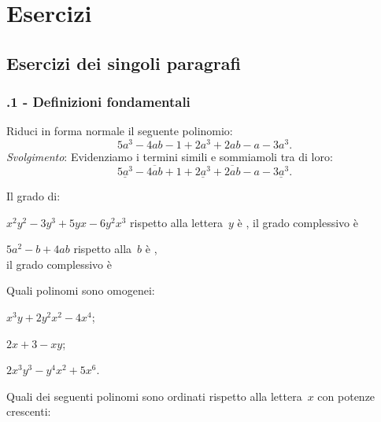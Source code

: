 \section{Esercizi}
\subsection{Esercizi dei singoli paragrafi}
\subsubsection*{\thechapter.1 - Definizioni fondamentali}
\begin{multicols}{2}
\begin{esercizio}
\label{ese:11.1}
Riduci in forma normale il seguente polinomio:
\[5a^3-4ab-1+2a^3+2ab-a-3a^3.\]
\emph{Svolgimento}: Evidenziamo i termini simili e sommiamoli tra di loro:
\[\underline{5a^3}-\overline{4ab}+1+\underline{2a^3}+\overline{2ab}-a-\underline{3a^3}.\]
\end{esercizio}

\begin{esercizio}
\label{ese:11.2}
Il grado di:
\begin{enumeratea}
\item $x^2y^2−3y^3+5yx−6y^2x^3$ rispetto alla lettera~$y$ è \dotfill, il grado complessivo è \dotfill
\item $5a^2−b+4ab$ rispetto alla~$b$ è \dotfill,\\ il grado complessivo è \dotfill
\end{enumeratea}
\end{esercizio}


\begin{esercizio}
\label{ese:11.3}
Quali polinomi sono omogenei:
\begin{enumeratea}
\item $x^3y+2y^2x^2−4x^4$;
\item $2x+3−xy$;
\item $2x^3y^3−y^4x^2+5x^6$.
\end{enumeratea}
\end{esercizio}

\begin{esercizio}
\label{ese:11.4}
Quali dei seguenti polinomi sono ordinati rispetto alla lettera~$x$ con potenze crescenti:


\end{esercizio}
\end{multicols}
